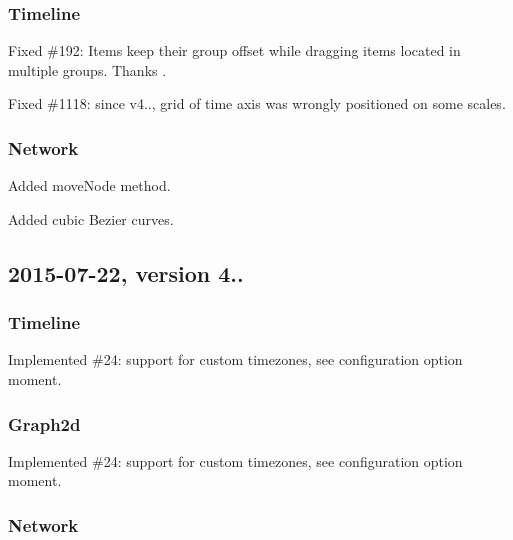 \subsubsection*{Timeline}


\begin{DoxyItemize}
\item Fixed \#192\+: Items keep their group offset while dragging items located in multiple groups. Thanks .
\item Fixed \#1118\+: since v4.., grid of time axis was wrongly positioned on some scales.
\end{DoxyItemize}

\subsubsection*{Network}


\begin{DoxyItemize}
\item Added move\+Node method.
\item Added cubic Bezier curves.
\end{DoxyItemize}

\subsection*{2015-\/07-\/22, version 4..}

\subsubsection*{Timeline}


\begin{DoxyItemize}
\item Implemented \#24\+: support for custom timezones, see configuration option {\ttfamily moment}.
\end{DoxyItemize}

\subsubsection*{Graph2d}


\begin{DoxyItemize}
\item Implemented \#24\+: support for custom timezones, see configuration option {\ttfamily moment}.
\end{DoxyItemize}

\subsubsection*{Network}


